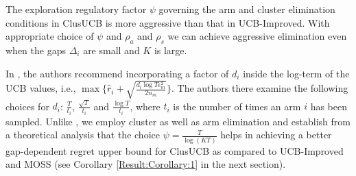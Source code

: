 The exploration regulatory factor $\psi$ governing the arm and cluster elimination conditions in ClusUCB is more aggressive than that in UCB-Improved. With appropriate choice of $\psi$ and $\rho_a$ and $\rho_s$ we can achieve aggressive elimination even when the gaps $\Delta_i$ are small and $K$ is large. 


In \cite{liu2016modification}, the authors recommend incorporating a factor of $d_i$ inside the log-term of the UCB values, i.e., $\max \lbrace\hat{r}_{i}+\sqrt{\frac{d_{i}\log T{\epsilon}_{m}^{2}}{2n_{m}}}\rbrace$. 
The authors there examine the following choices for $d_i$: $\frac{T}{t_{i}}$, $\frac{\sqrt{T}}{t_{i}}$ and $\frac{\log T}{t_{i}}$, where $t_{i}$ is the number of times an arm ${i}$ has been sampled.
Unlike \cite{liu2016modification}, we employ cluster as well as arm elimination and establish from a theoretical analysis that the choice $\psi=\frac{T}{\log (KT)}$ helps in achieving a better gap-dependent regret upper bound for ClusUCB as compared to UCB-Improved and MOSS (see Corollary \ref{Result:Corollary:1} in the next section). 







